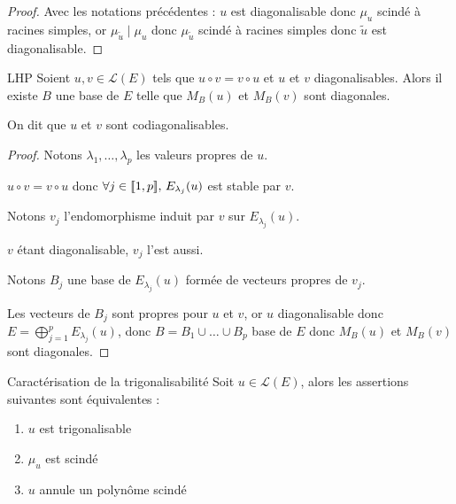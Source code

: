\begin{proof}
    Avec les notations précédentes : $u$ est diagonalisable donc $\mu_u$
    scindé à racines simples, or $\mu_{\tilde u} \mid \mu_u$ donc $\mu_{\tilde u}$ 
    scindé à racines simples donc $\tilde u$ est diagonalisable.
\end{proof}

\begin{corollaire}{LHP}{}
    Soient $u, v \in \mathscr L(E)$ tels que $u \circ v = v \circ u$ et 
    $u$ et $v$ diagonalisables. Alors il existe $B$ une base de $E$ telle que 
    $M_B(u)$ et $M_B(v)$ sont diagonales.

    On dit que $u$ et $v$ sont codiagonalisables.
\end{corollaire}

\begin{proof}
    Notons $\lambda_1, \dots, \lambda_p$ les valeurs propres de $u$. 

    $u \circ v = v \circ u$ donc $\forall j \in [\![1, p]\!], \, E_{\lambda_j}(u)$ est stable par $v$.

    Notons $v_j$ l'endomorphisme induit par $v$ sur $E_{\lambda_j}(u)$.

    $v$ étant diagonalisable, $v_j$ l'est aussi. 

    Notons $B_j$ une base de $E_{\lambda_j}(u)$ formée de vecteurs propres de $v_j$.

    Les vecteurs de $B_j$ sont propres pour $u$ et $v$, or $u$ diagonalisable donc 
    $E = \displaystyle \bigoplus_{j = 1 }^{ p } E_{\lambda_j}(u)$, donc 
    $B = B_1 \cup \dots \cup B_p$ base de $E$ donc $M_B(u)$ et $M_B(v)$ sont diagonales.
\end{proof}

\begin{theoreme}{Caractérisation de la trigonalisabilité}{}
    Soit $u \in \mathscr L(E)$, alors les assertions suivantes sont équivalentes :  
    \begin{enumerate}
        \item $u$ est trigonalisable
        \item $\mu_u$ est scindé
        \item $u$ annule un polynôme scindé
    \end{enumerate}
\end{theoreme}

